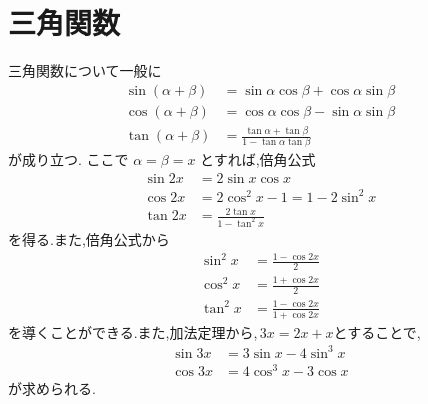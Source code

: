 \section{三角関数}
  三角関数について一般に
  \begin{align*}
    \sin(\alpha+\beta)
      &=\sin\alpha\cos\beta+\cos\alpha\sin\beta\\
    \cos(\alpha+\beta)
      &=\cos\alpha\cos\beta-\sin\alpha\sin\beta\\
    \tan(\alpha+\beta)
      &=\frac{\tan\alpha+\tan\beta}
              {1-\tan\alpha\tan\beta}
  \end{align*}
  が成り立つ.
  ここで $\alpha=\beta=x$ とすれば,倍角公式
  \begin{align*}
    \sin 2x&=2\sin x\cos x\\
    \cos 2x&=2\cos^2x-1=1-2\sin^2x\\
    \tan 2x&=\frac{2\tan x}{1-\tan^2x}
  \end{align*}
  を得る.また,倍角公式から
  \begin{align*}
    \sin^2x&=\frac{1-\cos 2x}{2}\\
    \cos^2x&=\frac{1+\cos 2x}{2}\\
    \tan^2x&=\frac{1-\cos 2x}{1+\cos 2x}
  \end{align*}
  を導くことができる.また,加法定理から,\,$3x=2x+x$とすることで,
  \begin{align*}
    \sin 3x&=3\sin x-4\sin^3x\\
    \cos 3x&=4\cos^3x-3\cos x
  \end{align*}
  が求められる.
